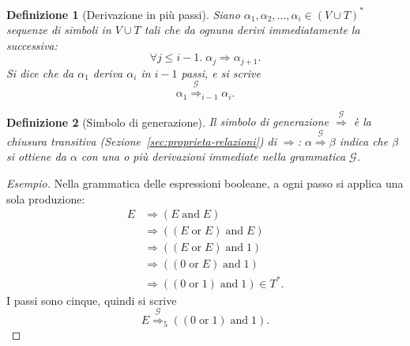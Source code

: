 \documentclass[a4paper, 11pt, oneside]{book}
\theoremstyle{formale}
\newtheorem*{definition}{Definizione}
\newenvironment{esempio}
    {\begin{proof}[\textit{Esempio}]\renewcommand{\qedsymbol}{$\diamond$}}
    {\end{proof}}
\begin{document}
    \begin{definition}[Derivazione in pi\`u passi]
        Siano $\alpha_1, \alpha_2, \dots, \alpha_i \in (V \cup T)^*$ sequenze di simboli in
        $V \cup T$ tali che da ognuna derivi immediatamente la successiva:
        \begin{equation*}
            \forall j \leq i - 1.\; \alpha_j \Rightarrow \alpha_{j+1}.
        \end{equation*}
        Si dice che da $\alpha_1$ \emph{deriva} $\alpha_i$ in $i - 1$ passi, e si scrive
        \begin{equation*}
            \alpha_1 \overset{\mathcal{G}}{\Rightarrow}_{i-1} \alpha_i.
        \end{equation*}
    \end{definition}

    \begin{definition}[Simbolo di generazione]
        Il \emph{simbolo di generazione} $\overset{\mathcal{G}}{\Rightarrow}$ \`e la
        chiusura transitiva (Sezione~\ref{sec:proprieta-relazioni}) di $\Rightarrow$:
        $\alpha \overset{\mathcal{G}}{\Rightarrow} \beta$ indica che $\beta$ si ottiene da
        $\alpha$ con una o pi\`u derivazioni immediate nella grammatica $\mathcal{G}$.
    \end{definition}

    \begin{esempio}
        Nella grammatica delle espressioni booleane, a ogni passo si applica una sola
        produzione:
        \begin{align*}
            E &\Rightarrow (E \;\mathrm{and}\; E) \\
            &\Rightarrow ((E \;\mathrm{or}\; E) \;\mathrm{and}\; E) \\
            &\Rightarrow ((E \;\mathrm{or}\; E) \;\mathrm{and}\; 1) \\
            &\Rightarrow ((0 \;\mathrm{or}\; E) \;\mathrm{and}\; 1) \\
            &\Rightarrow ((0 \;\mathrm{or}\; 1) \;\mathrm{and}\; 1) \in T^*.
        \end{align*}
        I passi sono cinque, quindi si scrive
        \begin{equation*}
            E \overset{\mathcal{G}}{\Rightarrow}_5
            ((0 \;\mathrm{or}\; 1) \;\mathrm{and}\; 1).
        \end{equation*}
    \end{esempio}
\end{document}
